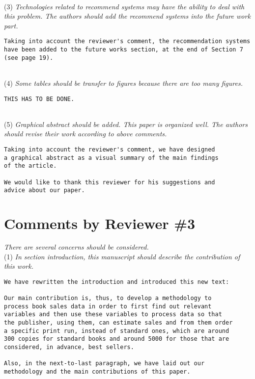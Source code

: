 \documentclass[preprint]{elsarticle}
\begin{document}
~\\
\noindent (3) \emph{Technologies related to recommend systems may have the ability to deal with this problem. The authors should add the recommend systems into the future work part. } 

\begin{verbatim}
Taking into account the reviewer's comment, the recommendation systems
have been added to the future works section, at the end of Section 7 
(see page 19).
\end{verbatim}
~\\
\noindent (4) \emph{Some tables should be transfer to figures because there are too many figures. } 

\begin{verbatim}
THIS HAS TO BE DONE.
\end{verbatim}

~\\
\noindent (5) \emph{Graphical abstract should be added. This paper is organized well. The authors should revise their work according to above comments. } 

\begin{verbatim}
Taking into account the reviewer's comment, we have designed 
a graphical abstract as a visual summary of the main findings 
of the article.

We would like to thank this reviewer for his suggestions and 
advice about our paper.
\end{verbatim}



\section{Comments by Reviewer \#3}

\noindent \emph{There are several concerns should be considered.}\\

\noindent (1) \emph{In section introduction, this manuscript should describe the contribution of this work. } 

\begin{verbatim}
We have rewritten the introduction and introduced this new text:

Our main contribution is, thus, to develop a methodology to 
process book sales data in order to first find out relevant 
variables and then use these variables to process data so that 
the publisher, using them, can estimate sales and from them order 
a specific print run, instead of standard ones, which are around 
300 copies for standard books and around 5000 for those that are 
considered, in advance, best sellers.

Also, in the next-to-last paragraph, we have laid out our 
methodology and the main contributions of this paper.
\end{verbatim}
\end{document}
